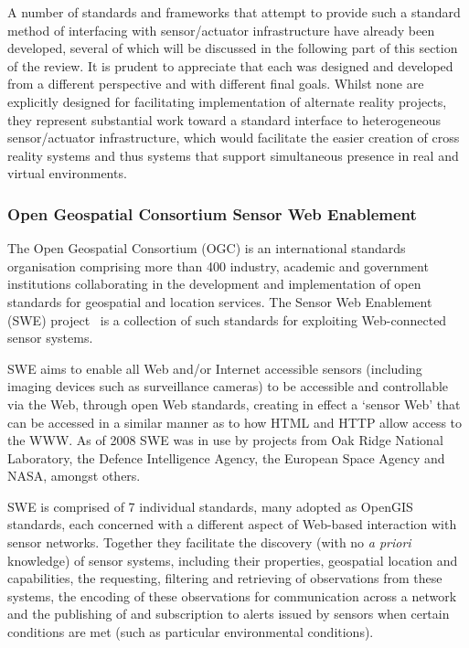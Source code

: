 A number of standards and frameworks that attempt to provide such a standard method of interfacing with sensor/actuator infrastructure have already been developed, several of which will be discussed in the following part of this section of the review. It is prudent to appreciate that each was designed and developed from a different perspective and with different final goals. Whilst none are explicitly designed for facilitating implementation of alternate reality projects, they represent substantial work toward a standard interface to heterogeneous sensor/actuator infrastructure, which would facilitate the easier creation of cross reality systems and thus systems that support simultaneous presence in real and virtual environments.

\subsubsection{Open Geospatial Consortium Sensor Web Enablement}
\label{subsec:ogc_swe}
The Open Geospatial Consortium (OGC) is an international standards organisation comprising more than 400 industry, academic and government institutions collaborating in the development and implementation of open standards for geospatial and location services. The Sensor Web Enablement (SWE) project~\cite{Botts2008} is a collection of such standards for exploiting Web-connected sensor systems.

SWE aims to enable all Web and/or Internet accessible sensors (including imaging devices such as surveillance cameras) to be accessible and controllable via the Web, through open Web standards, creating in effect a `sensor Web' that can be accessed in a similar manner as to how HTML and HTTP allow access to the WWW. As of 2008 SWE was in use by projects from Oak Ridge National Laboratory, the Defence Intelligence Agency, the European Space Agency and NASA, amongst others.

SWE is comprised of 7 individual standards, many adopted as OpenGIS standards, each concerned with a different aspect of Web-based interaction with sensor networks. Together they facilitate the discovery (with no \textit{a priori} knowledge) of sensor systems, including their properties, geospatial location and capabilities, the requesting, filtering and retrieving of observations from these systems, the encoding of these observations for communication across a network and the publishing of and subscription to alerts issued by sensors when certain conditions are met (such as particular environmental conditions).

